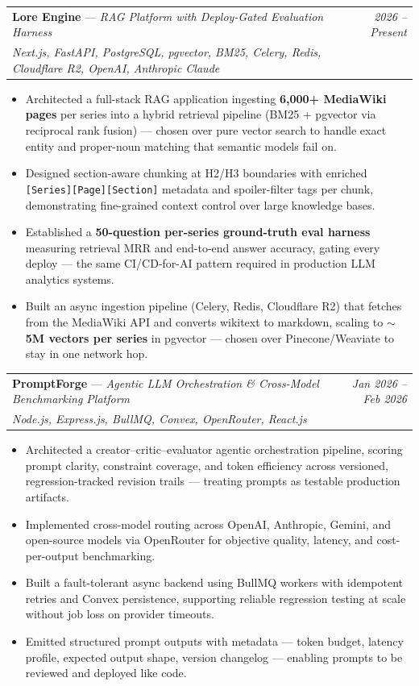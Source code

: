 \documentclass[a4paper,11pt]{article}
\makeatletter
\newcommand{\resumeProject}[4]{
\vspace{0.5mm}\item
    \begin{tabular*}{0.98\textwidth}[t]{l@{\extracolsep{\fill}}r}
        \textbf{#1} \textnormal{---} \textit{#2} & \textit{\footnotesize{#4}} \\
        \footnotesize{\textit{#3}} & \\
    \end{tabular*}
    \vspace{-2.4mm}
}
\newcommand{\resumeItemListStart}{\begin{justify}\begin{itemize}[leftmargin=3ex, rightmargin=2ex, noitemsep,labelsep=1.2mm,itemsep=0mm]\footnotesize}
\newcommand{\resumeItemListEnd}{\end{itemize}\end{justify}\vspace{-2mm}}
\makeatother
\begin{document}
    \resumeProject
      {Lore Engine}{RAG Platform with Deploy-Gated Evaluation Harness}
      {Next.js, FastAPI, PostgreSQL, pgvector, BM25, Celery, Redis, Cloudflare R2, OpenAI, Anthropic Claude}
      {2026 -- Present}
      \resumeItemListStart
        \item {Architected a full-stack RAG application ingesting \textbf{6,000+ MediaWiki pages} per series into a hybrid retrieval pipeline (BM25 + pgvector via reciprocal rank fusion) --- chosen over pure vector search to handle exact entity and proper-noun matching that semantic models fail on.}
        \item {Designed section-aware chunking at H2/H3 boundaries with enriched \texttt{[Series][Page][Section]} metadata and spoiler-filter tags per chunk, demonstrating fine-grained context control over large knowledge bases.}
        \item {Established a \textbf{50-question per-series ground-truth eval harness} measuring retrieval MRR and end-to-end answer accuracy, gating every deploy --- the same CI/CD-for-AI pattern required in production LLM analytics systems.}
        \item {Built an async ingestion pipeline (Celery, Redis, Cloudflare R2) that fetches from the MediaWiki API and converts wikitext to markdown, scaling to \textbf{$\sim$5M vectors per series} in pgvector --- chosen over Pinecone/Weaviate to stay in one network hop.}
      \resumeItemListEnd
    \vspace{-2mm}

    \resumeProject
      {PromptForge}{Agentic LLM Orchestration \& Cross-Model Benchmarking Platform}
      {Node.js, Express.js, BullMQ, Convex, OpenRouter, React.js}
      {Jan 2026 -- Feb 2026}
      \resumeItemListStart
        \item {Architected a creator--critic--evaluator agentic orchestration pipeline, scoring prompt clarity, constraint coverage, and token efficiency across versioned, regression-tracked revision trails --- treating prompts as testable production artifacts.}
        \item {Implemented cross-model routing across OpenAI, Anthropic, Gemini, and open-source models via OpenRouter for objective quality, latency, and cost-per-output benchmarking.}
        \item {Built a fault-tolerant async backend using BullMQ workers with idempotent retries and Convex persistence, supporting reliable regression testing at scale without job loss on provider timeouts.}
        \item {Emitted structured prompt outputs with metadata --- token budget, latency profile, expected output shape, version changelog --- enabling prompts to be reviewed and deployed like code.}
      \resumeItemListEnd
\end{document}
